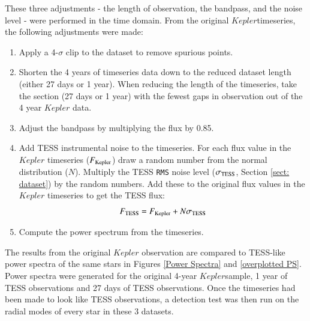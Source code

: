 \documentclass[a4paper,fleqn,usenatbib,useAMS]{mnras}
\newcommand{\kep}{\ensuremath{Kepler}\:}
\begin{document}
These three adjustments - the length of observation, the bandpass, and the noise level - were performed in the time domain. From the original \kep timeseries, the following adjustments were made:
\begin{enumerate}
\item Apply a 4-$\sigma$ clip to the dataset to remove spurious points.
\item Shorten the 4 years of timeseries data down to the reduced dataset length (either 27 days or 1 year). When reducing the length of the timeseries, take the section (27 days or 1 year) with the fewest gaps in observation out of the 4 year $Kepler$ data.%
\item Adjust the bandpass by multiplying the flux by 0.85.
\item Add TESS instrumental noise to the timeseries. For each flux value in the $Kepler$ timeseries ($F_{\rm Kepler}$) draw a random number from the normal distribution ($N$). Multiply the TESS \texttt{RMS} noise level ($\sigma_{\rm TESS}$, Section \ref{sect: dataset}) by the random numbers. Add these to the original flux values in the $Kepler$ timeseries to get the TESS flux:
\begin{equation}
F_{\rm TESS} = F_{\rm Kepler} + N\sigma_{\rm TESS}
\end{equation}

\item Compute the power spectrum from the timeseries.
\end{enumerate}

The results from the original $Kepler$ observation are compared to TESS-like power spectra of the same stars in Figures \ref{Power Spectra} and \ref{overplotted PS}. Power spectra were generated for the original 4-year \kep sample, 1 year of TESS observations and 27 days of TESS observations. Once the timeseries had been made to look like TESS observations, a detection test was then run on the radial modes of every star in these 3 datasets. 
\end{document}

